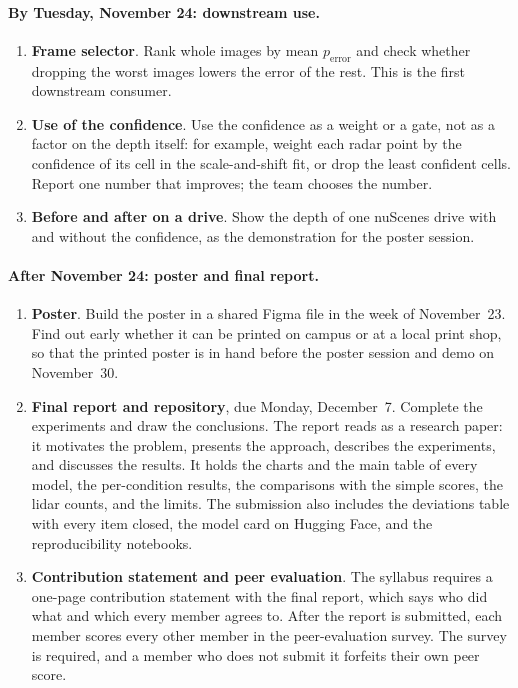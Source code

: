 \paragraph{By Tuesday, November 24: downstream use.}
\begin{enumerate}[leftmargin=*, itemsep=2pt, topsep=2pt, resume]
  \item \textbf{Frame selector}. Rank whole images by mean $p_\mathrm{error}$ and check whether dropping the worst images lowers the error of the rest. This is the first downstream consumer.
  \item \textbf{Use of the confidence}. Use the confidence as a weight or a gate, not as a factor on the depth itself: for example, weight each radar point by the confidence of its cell in the scale-and-shift fit, or drop the least confident cells. Report one number that improves; the team chooses the number.
  \item \textbf{Before and after on a drive}. Show the depth of one nuScenes drive with and without the confidence, as the demonstration for the poster session.
\end{enumerate}

\paragraph{After November 24: poster and final report.}
\begin{enumerate}[leftmargin=*, itemsep=2pt, topsep=2pt, resume]
  \item \textbf{Poster}. Build the poster in a shared Figma file in the week of November~23. Find out early whether it can be printed on campus or at a local print shop, so that the printed poster is in hand before the poster session and demo on November~30.
  \item \textbf{Final report and repository}, due Monday, December~7. Complete the experiments and draw the conclusions. The report reads as a research paper: it motivates the problem, presents the approach, describes the experiments, and discusses the results. It holds the charts and the main table of every model, the per-condition results, the comparisons with the simple scores, the lidar counts, and the limits. The submission also includes the deviations table with every item closed, the model card on Hugging Face, and the reproducibility notebooks.
  \item \textbf{Contribution statement and peer evaluation}. The syllabus requires a one-page contribution statement with the final report, which says who did what and which every member agrees to. After the report is submitted, each member scores every other member in the peer-evaluation survey. The survey is required, and a member who does not submit it forfeits their own peer score.
\end{enumerate}


